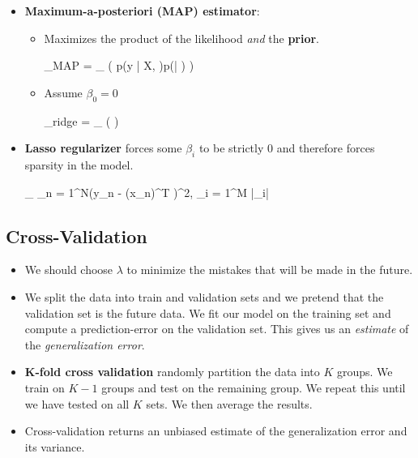 \begin{itemize}
    \item \textbf{Maximum-a-posteriori (MAP) estimator}: %
	     \begin{itemize}
	     	\item Maximizes the product of the likelihood \textit{and} the \textbf{prior}.
	     	\begin{myalign*}
	     	     \bm \beta_{MAP} = \argmax_{\bm \beta} 
	     	     \left(
	     	     	p(\*y | \*X, \bm \Lambda)p(\bm \beta | \bm \Sigma)
	     	     \right)
	     	 \end{myalign*} 
	     	\item Assume $\beta_0 = 0$
	     	\begin{myalign*}
	     	    \bm \beta_{ridge} = \argmax_{\bm \beta}
	     	    \left(
		     	    \log 
		     	    \left[
		     	    	\prod_{n = 1}^N \N(y_n | \*x^T_n \bm \beta, \bm \Lambda) \times \N(\bm \beta | 0, \*I)
		     	    \right]
		     	\right)
	     	\end{myalign*}
	     \end{itemize}
	\item \textbf{Lasso regularizer} forces some $\beta_i$ to be strictly 0 and therefore forces sparsity in the model.
	\begin{myalign*}
	    \min_{\bm \beta}  \sum_{n = 1}^N(y_n - \bm{\tilde{\phi}}(\*x_n)^T \bm \beta)^2, \hspace{10pt}  \sum_{i = 1}^M |\beta_i| \leq \tau
	\end{myalign*}
\end{itemize}

\subsection{Cross-Validation}
\begin{itemize}
	\item We should choose $\lambda$ to minimize the mistakes that will be made in the future.
	\item We split the data into train and validation sets and we pretend that the validation set is the future data. We fit our model on the training set and compute a prediction-error on the validation set. This gives us an \textit{estimate} of the \textit{generalization error}.
	\item \textbf{K-fold cross validation} randomly partition the data into $K$ groups. We train on $K - 1$ groups and test on the remaining group. We repeat this until we have tested on all $K$ sets. We then average the results.
	\item Cross-validation returns an unbiased estimate of the generalization error and its variance.
\end{itemize}

